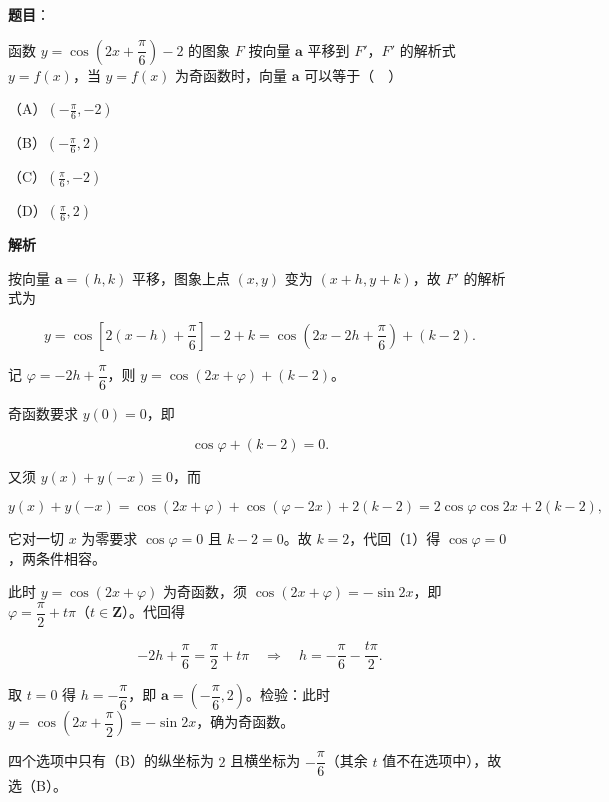 \begin{answer}

\textbf{题目}：

函数 $y=\cos\left(2x+\dfrac\pi6\right)-2$ 的图象 $F$ 按向量 $\boldsymbol a$ 平移到 $F'$，$F'$ 的解析式 $y=f(x)$，当 $y=f(x)$ 为奇函数时，向量 $\boldsymbol a$ 可以等于（　）

（A）$\left(-\frac\pi6,-2\right)$

（B）$\left(-\frac\pi6,2\right)$

（C）$\left(\frac\pi6,-2\right)$

（D）$\left(\frac\pi6,2\right)$

\textbf{解析}

按向量 $\boldsymbol a=(h,k)$ 平移，图象上点 $(x,y)$ 变为 $(x+h,y+k)$，故 $F'$ 的解析式为

\nopagebreak[4]
\[y=\cos\left[2(x-h)+\frac\pi6\right]-2+k=\cos\left(2x-2h+\frac\pi6\right)+(k-2).\]

记 $\varphi=-2h+\dfrac\pi6$，则 $y=\cos(2x+\varphi)+(k-2)$。

奇函数要求 $y(0)=0$，即

\nopagebreak[4]
\[\cos\varphi+(k-2)=0. \tag{1}\]

又须 $y(x)+y(-x)\equiv0$，而

\nopagebreak[4]
\[y(x)+y(-x)=\cos(2x+\varphi)+\cos(\varphi-2x)+2(k-2)=2\cos\varphi\cos2x+2(k-2),\]

它对一切 $x$ 为零要求 $\cos\varphi=0$ 且 $k-2=0$。故 $k=2$，代回（1）得 $\cos\varphi=0$，两条件相容。

此时 $y=\cos(2x+\varphi)$ 为奇函数，须 $\cos(2x+\varphi)=-\sin2x$，即 $\varphi=\dfrac\pi2+t\pi$（$t\in\mathbf Z$）。代回得

\nopagebreak[4]
\[-2h+\frac\pi6=\frac\pi2+t\pi\quad\Longrightarrow\quad h=-\frac\pi6-\frac{t\pi}{2}.\]

取 $t=0$ 得 $h=-\dfrac\pi6$，即 $\boldsymbol a=\left(-\dfrac\pi6,2\right)$。检验：此时 $y=\cos\left(2x+\dfrac\pi2\right)=-\sin2x$，确为奇函数。

四个选项中只有（B）的纵坐标为 $2$ 且横坐标为 $-\dfrac\pi6$（其余 $t$ 值不在选项中），故选（B）。


\end{answer}
